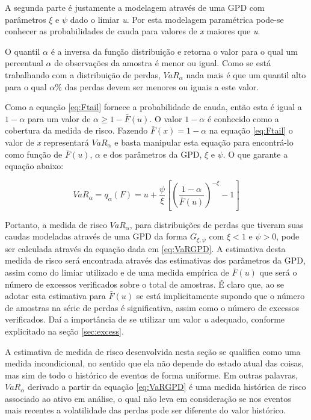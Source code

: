 \documentclass[review]{elsarticle}
\theoremstyle{definition}
\begin{document}
A segunda parte é justamente a modelagem através de uma GPD com parâmetros $\xi$ e $\psi$ dado o limiar \emph{u}. Por esta modelagem paramétrica pode-se conhecer as probabilidades de cauda para valores de \emph{x} maiores que \emph{u}.

O quantil $\alpha$ é a inversa da função distribuição e retorna o valor para o qual um percentual $\alpha$ de observações da amostra é menor ou igual. Como se está trabalhando com a distribuição de perdas, $VaR_\alpha$ nada mais é que um quantil alto para o qual $\alpha \%$ das perdas devem ser menores ou iguais a este valor.

Como a equação \eqref{eq:Ftail} fornece a probabilidade de cauda, então esta é igual a $1- \alpha$ para um valor de $\alpha  \geq 1-\bar{F}(u)$. O valor $1- \alpha$ é conhecido como a cobertura da medida de risco. Fazendo $\bar{F}(x)=1-\alpha$ na equação \eqref{eq:Ftail} o valor de \emph{x} representará $VaR_\alpha$ e basta manipular esta equação para encontrá-lo como função de $\bar{F}(u)$, $\alpha$ e dos parâmetros da GPD, $\xi$ e $\psi$. O que garante a equação abaixo:

\begin{equation}
\label{eq:VaRGPD}
VaR_\alpha = q_\alpha(F) = u+\frac{\psi}{\xi}\left[ \left( \frac{1-\alpha}{\bar{F}(u)}\right)^{-\xi}-1 \right]
\end{equation}

Portanto, a medida de risco $VaR_\alpha$, para distribuições de perdas que tiveram suas caudas modeladas através de uma GPD da forma $G_{\xi, \psi}$ com $\xi <1 \text{ e } \psi > 0$, pode ser calculada através da equação dada em \eqref{eq:VaRGPD}. A estimativa desta medida de risco será encontrada através das estimativas dos parâmetros da GPD, assim como do limiar utilizado e de uma medida empírica de $\bar{F}(u)$ que será o número de excessos verificados sobre o total de amostras. É claro que, ao se adotar esta estimativa para $\bar{F}(u)$ se está implicitamente supondo que o número de amostras na série de perdas é significativa, assim como o número de excessos verificados. Daí a importância de se utilizar um valor \emph{u} adequado, conforme explicitado na seção \ref{sec:excess}.

A estimativa de medida de risco desenvolvida nesta seção se qualifica como uma medida incondicional, no sentido que ela não depende do estado atual das coisas, mas sim de todo o histórico de eventos de forma uniforme. Em outras palavras, $VaR_\alpha$ derivado a partir da equação \eqref{eq:VaRGPD} é uma medida histórica de risco associado ao ativo em análise, o qual não leva em consideração se nos eventos mais recentes a volatilidade das perdas pode ser diferente do valor histórico.
\end{document}
